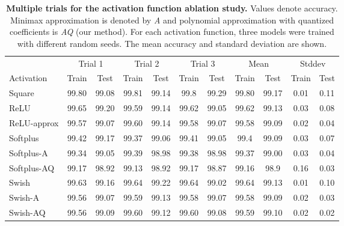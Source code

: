 \documentclass[conference]{IEEEtran}
\begin{document}
\begin{table}[!htbp]
    \centering
    \small
    \begin{tabular}{@{}l|c|c|c|c|c|c|c|c|c|c@{}}
    \toprule
     &  \multicolumn{2}{c|}{Trial 1} & \multicolumn{2}{c|}{Trial 2} & \multicolumn{2}{c|}{Trial 3} & \multicolumn{2}{c|}{Mean} & \multicolumn{2}{c}{Stddev} \\ 
    Activation & Train & Test & Train & Test & Train & Test & Train & Test & Train & Test \\
 \midrule
    Square & 99.80 & 99.08 & 99.81 & 99.14 & 99.8 & 99.29 & 99.80 & 99.17 & 0.01 & 0.11 \\ 
    ReLU & 99.65 & 99.20 & 99.59 & 99.14 & 99.62 & 99.05 & 99.62 & 99.13 & 0.03 & 0.08  \\
    ReLU-approx & 99.57 & 99.07 & 99.60 & 99.14 & 99.58 & 99.07 & 99.58 & 99.09 & 0.02 & 0.04\\ \midrule
    Softplus & 99.42 & 99.17 & 99.37 & 99.06 & 99.41 & 99.05 & 99.4 & 99.09 & 0.03 & 0.07 \\
    Softplus-A & 99.34 & 99.05 & 99.39 & 98.98 & 99.38 & 98.98 & 99.37 & 99.00 & 0.03 & 0.04 \\
    Softplus-AQ & 99.17 & 98.92 & 99.13 & 98.92 & 99.17 & 98.87 & 99.16 & 98.9 & 0.16 & 0.03 \\ \midrule
    Swish & 99.63 & 99.16 & 99.64 & 99.22 & 99.64 & 99.02 & 99.64 & 99.13 & 0.01 & 0.10  \\
    Swish-A & 99.56 & 99.07 & 99.59 & 99.13 & 99.58 & 99.07 & 99.58 & 99.09 & 0.02 & 0.03 \\ 
    Swish-AQ & 99.56 & 99.09 & 99.60 & 99.12 & 99.60 & 99.08 & 99.59 & 99.10 & 0.02 & 0.02 \\
    \bottomrule
    \end{tabular}
    \caption{\textbf{Multiple trials for the activation function ablation study.} Values denote accuracy. Minimax approximation is denoted by \textit{A} and polynomial approximation with quantized coefficients is \textit{AQ} (our method). For each activation function, three models were trained with different random seeds. The mean accuracy and standard deviation are shown.}
    \label{table:sup_fullactivations}
\end{table}


\end{document}
